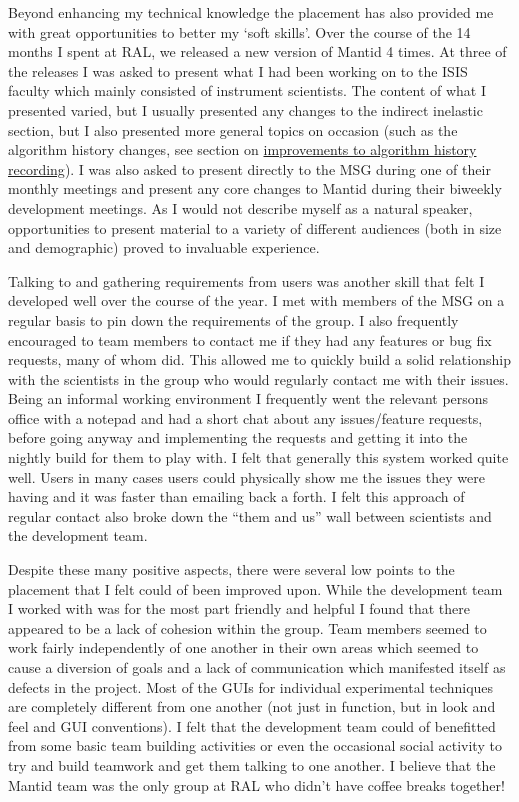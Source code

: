 \documentclass[paper=a4, fontsize=11pt]{scrartcl}	%
\numberwithin{equation}{section}															%
\numberwithin{figure}{section}																%
\numberwithin{table}{section}
\begin{document}
Beyond enhancing my technical knowledge the placement has also provided
me with great opportunities to better my `soft skills'. Over the course
of the 14 months I spent at RAL, we released a new version of Mantid 4
times. At three of the releases I was asked to present what I had been
working on to the ISIS faculty which mainly consisted of instrument
scientists. The content of what I presented varied, but I usually
presented any changes to the indirect inelastic section, but I also
presented more general topics on occasion (such as the algorithm history
changes, see section on
\hyperref[improvements-to-algorithm-history-recording]{improvements to
algorithm history recording}). I was also asked to present directly to
the MSG during one of their monthly meetings and present any core
changes to Mantid during their biweekly development meetings. As I would
not describe myself as a natural speaker, opportunities to present
material to a variety of different audiences (both in size and
demographic) proved to invaluable experience.

Talking to and gathering requirements from users was another skill that
felt I developed well over the course of the year. I met with members of
the MSG on a regular basis to pin down the requirements of the group. I
also frequently encouraged to team members to contact me if they had any
features or bug fix requests, many of whom did. This allowed me to
quickly build a solid relationship with the scientists in the group who
would regularly contact me with their issues. Being an informal working
environment I frequently went the relevant persons office with a notepad
and had a short chat about any issues/feature requests, before going
anyway and implementing the requests and getting it into the nightly
build for them to play with. I felt that generally this system worked
quite well. Users in many cases users could physically show me the
issues they were having and it was faster than emailing back a forth. I
felt this approach of regular contact also broke down the ``them and
us'' wall between scientists and the development team.

Despite these many positive aspects, there were several low points to
the placement that I felt could of been improved upon. While the
development team I worked with was for the most part friendly and
helpful I found that there appeared to be a lack of cohesion within the
group. Team members seemed to work fairly independently of one another
in their own areas which seemed to cause a diversion of goals and a lack
of communication which manifested itself as defects in the project. Most
of the GUIs for individual experimental techniques are completely
different from one another (not just in function, but in look and feel
and GUI conventions). I felt that the development team could of
benefitted from some basic team building activities or even the
occasional social activity to try and build teamwork and get them
talking to one another. I believe that the Mantid team was the only
group at RAL who didn't have coffee breaks together!
\end{document}
